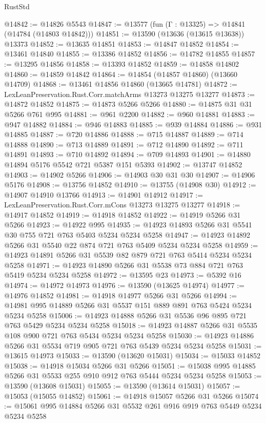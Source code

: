 \begin{lexlean}{RustStd}
\begin{coremodule}
@14842 := @14826 @5543
@14847 := @13577 (fun (Γ : @13325) => @14841 (@14784 (@14803 @14842)))
@14851 := @13590 (@13636 (@13615 @13638)) @13373
@14852 := @13635 @14851
@14853 := @14847 @14852
@14854 := @13461 @14840
@14855 := @13386 @14852
@14856 := @14782 @14855
@14857 := @13295 @14856
@14858 := @13393 @14852
@14859 := @14858 @14802
@14860 := @14859 @14842
@14864 := @14854 (@14857 @14860) (@13660 @14709)
@14868 := @13461 @14856 @14860 (@13665 @14781)
@14872 := LexLeanPreservation.Rust.Corr.matchArms @13273 @13275 @13277
@14873 := @14872 @14852
@14875 := @14873 @5266 @5266
@14880 := @14875 @31 @31 @5266 @761 @995
@14881 := @961 @2200
@14882 := @960 @14881
@14883 := @947 @14882
@14884 := @946 @14883
@14885 := @939 @14884
@14886 := @931 @14885
@14887 := @720 @14886
@14888 := @715 @14887
@14889 := @714 @14888
@14890 := @713 @14889
@14891 := @712 @14890
@14892 := @711 @14891
@14893 := @710 @14892
@14894 := @709 @14893
@14901 := @14880 @14894 @5176 @5542 @721 @5387 @151 @5393
@14902 := @13747 @14852
@14903 := @14902 @5266
@14906 := @14903 @30 @31 @30
@14907 := @14906 @5176
@14908 := @13756 @14852
@14910 := @13755 (@14908 @30)
@14912 := @14907 @14910 @13766
@14913 := @14901 @14912
@14917 := LexLeanPreservation.Rust.Corr.mCons @13273 @13275 @13277
@14918 := @14917 @14852
@14919 := @14918 @14852
@14922 := @14919 @5266 @31 @5266
@14923 := @14922 @995
@14935 := @14923 @14893 @5266 @31 @5541 @30 @755 @721 @763 @5403 @5234 @5234 @5258
@14947 := @14923 @14892 @5266 @31 @5540 @22 @874 @721 @763 @5409 @5234 @5234 @5258
@14959 := @14923 @14891 @5266 @31 @5539 @82 @879 @721 @763 @5414 @5234 @5234 @5258
@14971 := @14923 @14890 @5266 @31 @5538 @73 @884 @721 @763 @5419 @5234 @5234 @5258
@14972 := @13595 @23
@14973 := @5392 @16
@14974 := @14972 @14973
@14976 := @13590 (@13625 @14974)
@14977 := @14976 @14852
@14981 := @14918 @14977 @5266 @31 @5266
@14994 := @14981 @995 @14889 @5266 @31 @5537 @151 @889 @891 @763 @5424 @5234 @5234 @5258
@15006 := @14923 @14888 @5266 @31 @5536 @96 @895 @721 @763 @5429 @5234 @5234 @5258
@15018 := @14923 @14887 @5266 @31 @5535 @108 @900 @721 @763 @5434 @5234 @5234 @5258
@15030 := @14923 @14886 @5266 @31 @5534 @719 @905 @721 @763 @5439 @5234 @5234 @5258
@15031 := @13615 @14973
@15033 := @13590 (@13620 @15031)
@15034 := @15033 @14852
@15038 := @14918 @15034 @5266 @31 @5266
@15051 := @15038 @995 @14885 @5266 @31 @5533 @255 @910 @912 @763 @5444 @5234 @5234 @5258
@15053 := @13590 (@13608 @15031)
@15055 := @13590 (@13614 @15031)
@15057 := @15053 (@15055 @14852)
@15061 := @14918 @15057 @5266 @31 @5266
@15074 := @15061 @995 @14884 @5266 @31 @5532 @261 @916 @919 @763 @5449 @5234 @5234 @5258

\end{coremodule}
\end{lexlean}
